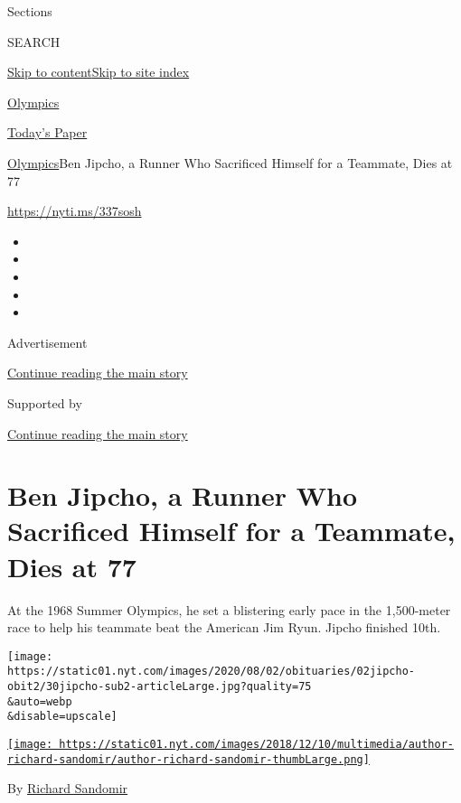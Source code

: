 Sections

SEARCH

\protect\hyperlink{site-content}{Skip to
content}\protect\hyperlink{site-index}{Skip to site index}

\href{https://www.nytimes.com/section/sports/olympics}{Olympics}

\href{https://myaccount.nytimes.com/auth/login?response_type=cookie\&client_id=vi}{}

\href{https://www.nytimes.com/section/todayspaper}{Today's Paper}

\href{/section/sports/olympics}{Olympics}\textbar{}Ben Jipcho, a Runner
Who Sacrificed Himself for a Teammate, Dies at 77

\url{https://nyti.ms/337sosh}

\begin{itemize}
\item
\item
\item
\item
\item
\end{itemize}

Advertisement

\protect\hyperlink{after-top}{Continue reading the main story}

Supported by

\protect\hyperlink{after-sponsor}{Continue reading the main story}

\hypertarget{ben-jipcho-a-runner-who-sacrificed-himself-for-a-teammate-dies-at-77}{%
\section{Ben Jipcho, a Runner Who Sacrificed Himself for a Teammate,
Dies at
77}\label{ben-jipcho-a-runner-who-sacrificed-himself-for-a-teammate-dies-at-77}}

At the 1968 Summer Olympics, he set a blistering early pace in the
1,500-meter race to help his teammate beat the American Jim Ryun. Jipcho
finished 10th.

\texttt{[image: https://static01.nyt.com/images/2020/08/02/obituaries/02jipcho-obit2/30jipcho-sub2-articleLarge.jpg?quality=75\\\&auto=webp\\\&disable=upscale]}

\href{https://www.nytimes.com/by/richard-sandomir}{\texttt{[image: https://static01.nyt.com/images/2018/12/10/multimedia/author-richard-sandomir/author-richard-sandomir-thumbLarge.png]}}

By \href{https://www.nytimes.com/by/richard-sandomir}{Richard Sandomir}

